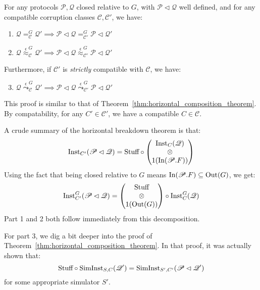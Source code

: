 \begin{theorem}
  For any protocols $\mathscr{P}, \mathscr{Q}$ closed relative to $G$, with $\mathscr{P} \lhd \mathscr{Q}$
  well defined, and for any compatible corruption classes $\mathscr{C}, \mathscr{C'}$, we have:
  \begin{enumerate}
    \item $\mathscr{Q} =^G_{\mathscr{C}} \mathscr{Q}' \implies \mathscr{P} \lhd \mathscr{Q} =^G_{\mathscr{C}'} \mathscr{P} \lhd \mathscr{Q}'$
    \item $\mathscr{Q} \overset{\epsilon}{\approx}^G_{\mathscr{C}} \mathscr{Q}' \implies \mathscr{P} \lhd \mathscr{Q} \overset{\epsilon}{\approx}^G_{\mathscr{C}'} \mathscr{P} \lhd \mathscr{Q}'$
  \end{enumerate}

  Furthermore, if $\mathscr{C}'$ is \emph{strictly} compatible with $\mathscr{C}$,
  we have:
  \begin{enumerate}
    \setcounter{enumi}{2}
    \item $\mathscr{Q} \overset{\epsilon}{\leadsto}^G_{\mathscr{C}} \mathscr{Q}' \implies \mathscr{P} \lhd \mathscr{Q} \overset{\epsilon}{\leadsto}^G_{\mathscr{C}'} \mathscr{P} \lhd \mathscr{Q}'$
  \end{enumerate}

   This proof is similar to that of Theorem~\ref{thm:horizontal_composition_theorem}.
  By compatability, for any $C' \in \mathscr{C}'$, we have a compatible $C \in \mathscr{C}$.

  A crude summary of the horizontal breakdown theorem is that:
  $$
  \text{Inst}_{C'}(\mathscr{P} \lhd \mathscr{Q})
  = \text{Stuff} \circ \begin{pmatrix}
    \text{Inst}_C(\mathscr{Q})\cr
    \otimes\cr
    1(\text{In}(\mathscr{P}.F))
  \end{pmatrix}
  $$
  Using the fact that being closed relative to $G$ means $\text{In}(\mathscr{P}.F) \subseteq \text{Out}(G)$,
  we get:
  $$
  \text{Inst}^G_{C'}(\mathscr{P} \lhd \mathscr{Q}) =
  \begin{pmatrix}
    \text{Stuff}\cr
    \otimes\cr
    1(\text{Out}(G))
  \end{pmatrix}
  \circ \text{Inst}^G_C(\mathscr{Q})
  $$
  Part 1 and 2 both follow immediately from this decomposition.

  For part 3, we dig a bit deeper into the proof of Theorem~\ref{thm:horizontal_composition_theorem}.
  In that proof, it was actually shown that:
  $$
  \text{Stuff} \circ \text{SimInst}_{S, C}(\mathscr{Q}') = \text{SimInst}_{S', C'}(\mathscr{P} \lhd \mathscr{Q}')
  $$
  for some appropriate simulator $S'$.


\end{theorem}
